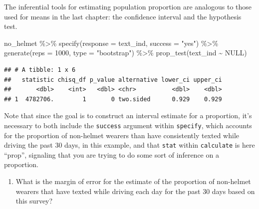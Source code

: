 \documentclass[
]{article}
\newenvironment{Shaded}{\begin{snugshade}}{\end{snugshade}}
\newcommand{\AttributeTok}[1]{\textcolor[rgb]{0.77,0.63,0.00}{#1}}
\newcommand{\ConstantTok}[1]{\textcolor[rgb]{0.00,0.00,0.00}{#1}}
\newcommand{\DecValTok}[1]{\textcolor[rgb]{0.00,0.00,0.81}{#1}}
\newcommand{\FunctionTok}[1]{\textcolor[rgb]{0.00,0.00,0.00}{#1}}
\newcommand{\NormalTok}[1]{#1}
\newcommand{\SpecialCharTok}[1]{\textcolor[rgb]{0.00,0.00,0.00}{#1}}
\newcommand{\StringTok}[1]{\textcolor[rgb]{0.31,0.60,0.02}{#1}}
\providecommand{\tightlist}{%
  \setlength{\itemsep}{0pt}\setlength{\parskip}{0pt}}
\begin{document}
The inferential tools for estimating population proportion are analogous
to those used for means in the last chapter: the confidence interval and
the hypothesis test.

\begin{Shaded}
\begin{Highlighting}[]
\NormalTok{no\_helmet }\SpecialCharTok{\%\textgreater{}\%}
  \FunctionTok{specify}\NormalTok{(}\AttributeTok{response =}\NormalTok{ text\_ind, }\AttributeTok{success =} \StringTok{"yes"}\NormalTok{) }\SpecialCharTok{\%\textgreater{}\%}
  \FunctionTok{generate}\NormalTok{(}\AttributeTok{reps =} \DecValTok{1000}\NormalTok{, }\AttributeTok{type =} \StringTok{"bootstrap"}\NormalTok{) }\SpecialCharTok{\%\textgreater{}\%}
  \FunctionTok{prop\_test}\NormalTok{(text\_ind }\SpecialCharTok{\textasciitilde{}} \ConstantTok{NULL}\NormalTok{)}
\end{Highlighting}
\end{Shaded}

\begin{verbatim}
## # A tibble: 1 x 6
##   statistic chisq_df p_value alternative lower_ci upper_ci
##       <dbl>    <int>   <dbl> <chr>          <dbl>    <dbl>
## 1  4782706.        1       0 two.sided      0.929    0.929
\end{verbatim}

Note that since the goal is to construct an interval estimate for a
proportion, it's necessary to both include the \texttt{success} argument
within \texttt{specify}, which accounts for the proportion of non-helmet
wearers than have consistently texted while driving the past 30 days, in
this example, and that \texttt{stat} within \texttt{calculate} is here
``prop'', signaling that you are trying to do some sort of inference on
a proportion.

\begin{enumerate}
\def\labelenumi{\arabic{enumi}.}
\setcounter{enumi}{2}
\tightlist
\item
  What is the margin of error for the estimate of the proportion of
  non-helmet wearers that have texted while driving each day for the
  past 30 days based on this survey?
\end{enumerate}
\end{document}

